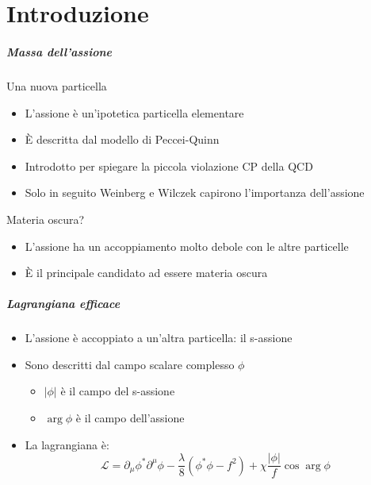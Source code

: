 \part{Introduzione}
\makepart

\begin{frame}
    \frametitle{Massa dell'assione}
    {\color{fzjblue} Una nuova particella}
    \begin{itemize}
        \item L'assione è un'ipotetica particella elementare
        \item È descritta dal modello di Peccei-Quinn
        \item Introdotto per spiegare la piccola violazione CP della QCD
        \item Solo in seguito Weinberg e Wilczek capirono l'importanza dell'assione
    \end{itemize}
    {\color{fzjblue} Materia oscura?}
    \begin{itemize}
        \item L'assione ha un accoppiamento molto debole con le altre particelle
        \item È il principale candidato ad essere materia oscura
    \end{itemize}
\end{frame}

\begin{frame}
    \frametitle{Lagrangiana efficace}
    \begin{itemize}
        \item L'assione è accoppiato a un'altra particella: il s-assione
        \item Sono descritti dal campo scalare complesso $\phi$
            \begin{itemize}
                \item $\left|\phi\right|$ è il campo del s-assione
                \item $\arg\phi$ è il campo dell'assione
            \end{itemize}
        \item La lagrangiana è:
        $$\mathcal{L} = \partial_\mu\phi^*\partial^\mu\phi%
                      - \frac{\lambda}{8}\left(\phi^*\phi-f^2\right)%
                      + \chi\frac{\left|\phi\right|}{f}\cos\arg\phi$$
    \end{itemize}
\end{frame}

